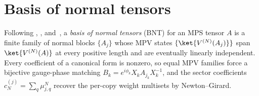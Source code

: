 \chapter{Basis of normal tensors}\label{ch:bnt}

Following \cite{PerezGarcia2007Matrix}, \cite{Cirac2016MPDO_arXiv},
and~\cite{Cirac2021Matrix}, a \emph{basis of normal tensors} (BNT) for an MPS
tensor $A$ is a finite family of normal blocks $\{A_j\}$ whose MPV states
$\{\ket{V^{(N)}(A_j)}\}$ span $\ket{V^{(N)}(A)}$ at every positive length and
are eventually linearly independent. Every coefficient of a canonical form is
nonzero, so equal MPV families force a bijective gauge-phase matching
$B_k = e^{i\phi_k} X_k A_{j_k} X_k^{-1}$, and the sector coefficients
$c_N^{(j)} = \sum_q \mu_{j,q}^N$ recover the per-copy weight multisets by
Newton--Girard.





